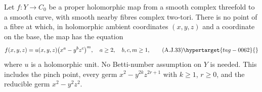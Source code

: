 \begin{proposition}\hypertarget{tag-01B5}{}\label{cdp:st:A.5.15}


Let $f:Y\to C_0$ be a proper holomorphic map from a
smooth complex threefold to a smooth curve, with smooth
nearby fibres complex two-tori. There is no point of
a fibre at which, in holomorphic ambient coordinates
$(x,y,z)$ and a coordinate on the base, the map has
the equation
\[
 f(x,y,z)=u(x,y,z)\bigl(x^a-y^bz^c\bigr)^m,
 \quad a\ge2,\quad b,c,m\ge1,                                    \tag{A.J.33}\hypertarget{tag-0062}{}\label{cdp:eq:A.J.33}
\]
where $u$ is a holomorphic unit. No Betti-number
assumption on $Y$ is needed. This includes the pinch
point, every germ $x^2-y^{2k}z^{2r+1}$ with
$k\ge1$, $r\ge0$, and the reducible germ
$x^2-y^2z^2$.
\end{proposition}

